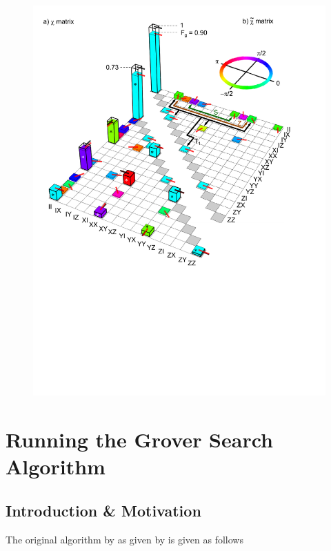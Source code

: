 \begin{figure}
	\centering
		\includegraphics[width=1.\textwidth]{./material/papers/iswap/figures/chi_matrix_and_error_process}
	\label{fig:GateChiMatrixAndErrorProcess}
	\caption{}
\end{figure}


\chapter{Running the Grover Search Algorithm}


\section{Introduction \& Motivation}

The original algorithm by as given by \cite{Grover_Quantum_1997} is given as follows

